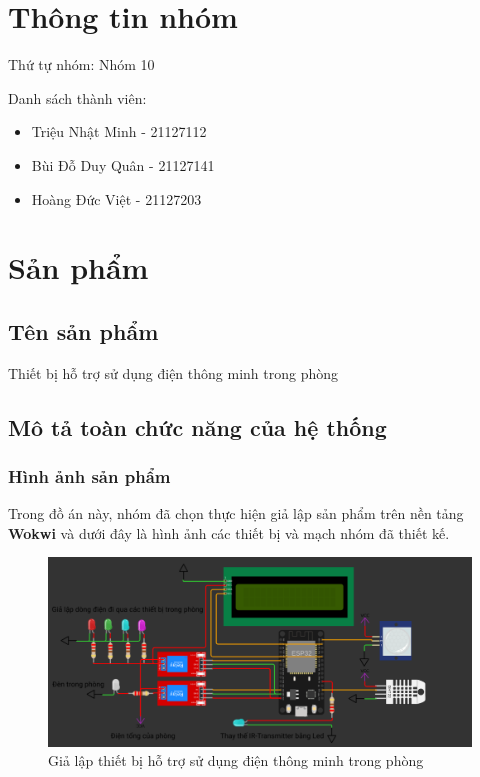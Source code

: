 \documentclass{report}
\begin{document}
\section{Thông tin nhóm}
Thứ tự nhóm: Nhóm 10 \par
Danh sách thành viên:
\begin{itemize}
    \item Triệu Nhật Minh - 21127112
    \item Bùi Đỗ Duy Quân - 21127141
    \item Hoàng Đức Việt - 21127203
\end{itemize}

\section{Sản phẩm}
\subsection{Tên sản phẩm}
Thiết bị hỗ trợ sử dụng điện thông minh trong phòng

\subsection{Mô tả toàn chức năng của hệ thống}
\subsubsection{Hình ảnh sản phẩm}
Trong đồ án này, nhóm đã chọn thực hiện giả lập sản phẩm trên nền tảng \textbf{Wokwi} và dưới đây là hình ảnh các thiết bị và mạch nhóm đã thiết kế.
\begin{figure}[!h]
    \centering
    \includegraphics[width=\textwidth, keepaspectratio]{thiet_bi.png}
    \caption{Giả lập thiết bị hỗ trợ sử dụng điện thông minh trong phòng}
\end{figure}
\end{document}
